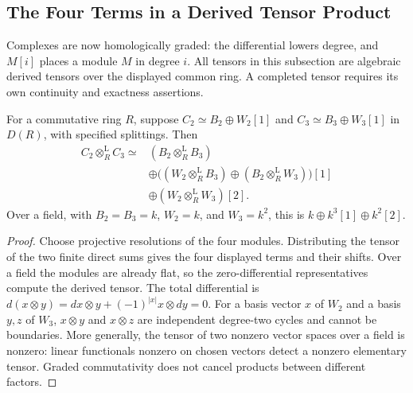 \subsection{The Four Terms in a Derived Tensor Product}

Complexes are now homologically graded: the differential lowers
degree, and \(M[i]\) places a module \(M\) in degree \(i\).
All tensors in this subsection are algebraic derived tensors over
the displayed common ring. A completed tensor requires its own
continuity and exactness assertions.

\begin{lemma}
\label{v4-arith:wild:four-term-tensor}
For a commutative ring \(R\), suppose
\(C_2\simeq B_2\oplus W_2[1]\) and
\(C_3\simeq B_3\oplus W_3[1]\) in \(D(R)\), with specified splittings.
Then
\begin{equation}
\label{v4-arith:wild:eq:four-term-tensor}
\begin{aligned}
 C_2\otimes_R^{\mathrm L}C_3\simeq{}&
 (B_2\otimes_R^{\mathrm L}B_3)\\
 &\oplus\bigl((W_2\otimes_R^{\mathrm L}B_3)
        \oplus(B_2\otimes_R^{\mathrm L}W_3)\bigr)[1]\\
 &\oplus(W_2\otimes_R^{\mathrm L}W_3)[2].
\end{aligned}
\end{equation}
Over a field, with \(B_2=B_3=k\), \(W_2=k\), and \(W_3=k^2\), this is
\(k\oplus k^3[1]\oplus k^2[2]\).
\end{lemma}
\begin{proof}
Choose projective resolutions of the four modules. Distributing
the tensor of the two finite direct sums gives the four displayed
terms and their shifts. Over a field the modules are already flat,
so the zero-differential representatives compute the derived tensor.
The total differential is
\(d(x\otimes y)=dx\otimes y+(-1)^{|x|}x\otimes dy=0\).
For a basis vector \(x\) of \(W_2\) and a basis \(y,z\) of \(W_3\),
\(x\otimes y\) and \(x\otimes z\) are independent degree-two
cycles and cannot be boundaries. More generally, the tensor of two
nonzero vector spaces over a field is nonzero: linear functionals
nonzero on chosen vectors detect a nonzero elementary tensor.
Graded commutativity does not cancel products between different factors.
\end{proof}

